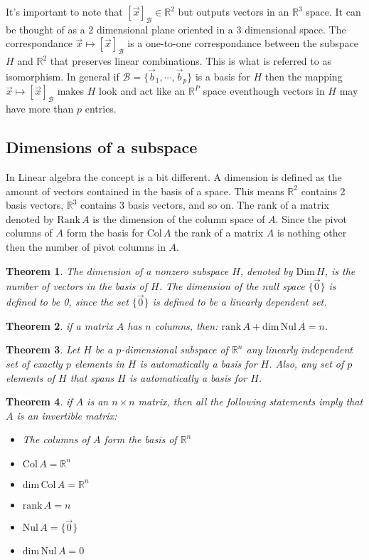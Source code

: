 \documentclass[11pt, a4paper]{article}
\newcommand*{\R}{\ensuremath{\mathbb{R}}}
\newtheorem{theorem}{Theorem}
\begin{document}
It's important to note that $\left[ \vec{x} \right]_{\mathcal{B}} \in \R^2$ but outputs vectors in an $\R^3$ space. It can be thought of as a 2 dimensional plane oriented in a 3 dimensional space. The correspondance $\vec{x} \mapsto \left[ \vec{x} \right]_{\mathcal{B}}$ is a one-to-one correspondance between the subspace $H$ and $\R^2$ that preserves linear combinations. This is what is referred to as isomorphism. In general if $\mathcal{B} = \{\vec{b}_1, \cdots, \vec{b}_p \}$ is a basis for $H$ then the mapping $\vec{x} \mapsto \left[ \vec{x} \right]_{\mathcal{B}}$ makes $H$ look and act like an $\R^P$ space eventhough vectors in $H$ may have more than $p$ entries.

\subsection{Dimensions of a subspace}
In Linear algebra the concept is a bit different. A dimension is defined as the amount of vectors contained in the basis of a space. This means $\R^2$ contains 2 basis vectors, $\R^3$ contains 3 basis vectors, and so on. The rank of a matrix denoted by $\text{Rank}\, A$ is the dimension of the column space of $A$. Since the pivot columns of $A$ form the basis for $\text{Col}\, A$ the rank of a matrix $A$ is nothing other then the number of pivot columns in $A$.

\begin{theorem}
    The dimension of a nonzero subspace $H$, denoted by  $\text{Dim}\, H$, is the number of vectors in the basis of $H$. The dimension of the null space $\{ \vec{0} \}$ is defined to be 0, since the set $\{ \vec{0} \}$ is defined to be a linearly dependent set.
\end{theorem}

\begin{theorem}
    if a matrix $A$ has $n$ columns, then: $\text{rank}\, A + \text{dim}\,\text{Nul}\,A = n$.
\end{theorem}

\begin{theorem}
    Let $H$ be a $p$-dimensional subspace of $\R^n$ any linearly independent set of exactly $p$ elements in $H$ is automatically a basis for $H$. Also, any set of $p$ elements of $H$ that spans $H$ is automatically a basis for $H$.
\end{theorem}

\begin{theorem}
    if $A$ is an $n \times n$ matrix, then all the following statements imply that $A$ is an invertible matrix:
    \begin{itemize}
        \item The columns of $A$ form the basis of $\R^n$
        \item $\text{Col}\, A = \R^n$
        \item $\text{dim}\,\text{Col}\, A = \R^n$
        \item $\text{rank}\, A = n$
        \item $\text{Nul}\, A = \{ \vec{0} \}$
        \item $\text{dim}\,\text{Nul}\, A = 0$
    \end{itemize}
\end{theorem}
\end{document}
